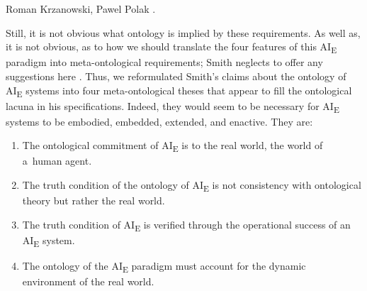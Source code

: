 \begin{artengenv2auth}{Roman Krzanowski, Pawel Polak}
\parencites[e.g.,][p.175]{varela_embodied_1991}[][]{klein_making_2006}[][]{froese_enactive_2009}[``the brain is conceived as participating in the action''][]{gallagher_brain_2013}[][]{di_paolo_enactive_2017}[][]{hutto_evolving_2017}[][]{newen_4e_2018}[][]{smith_promise_2019}[][]{newen_oxford_2020}[][]{kaufer_phenomenology_2021}[][]{shapiro_embodied_2021}[``enacted AI''][]{shin_embodying_2021}[][]{hipolito_enactive-dynamic_2022}.%


Still, it is not obvious what ontology is implied by these requirements. As well as, it is not obvious, as to how we should translate the four features of this AI\textsubscript{E} paradigm into meta-ontological requirements; Smith neglects to offer any suggestions here
\parencites[][]{smith_origin_1998}[][]{mitchell_artificial_2019}. %
 Thus, we reformulated Smith's claims about the ontology of AI\textsubscript{E} systems into four meta-ontological theses that appear to fill the ontological lacuna in his specifications. Indeed, they would seem to be necessary for AI\textsubscript{E} systems to be embodied, embedded, extended, and enactive. They are:
%
%
%
\begin{enumerate}[label=T\arabic*.]
\item The ontological commitment of AI\textsubscript{E} is to the real world, the world of a~human agent.
\item The truth condition of the ontology of AI\textsubscript{E} is not consistency with ontological theory but rather the real world.
\item The truth condition of AI\textsubscript{E} is verified through the operational success of an AI\textsubscript{E} system.
\item The ontology of the AI\textsubscript{E} paradigm must account for the dynamic environment of the real world.
\end{enumerate}



\end{artengenv2auth}
